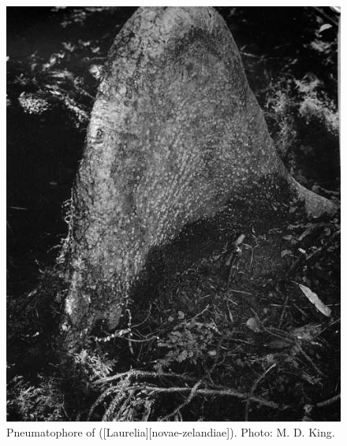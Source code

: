 \begin{figure}[t]
\begin{minipage}[t]{\textwidth}
\begin{minipage}[t]{(\textwidth-\fgap-\fgap) * \real{0.362}}
			\includegraphics[width=\textwidth]{graphics/fig_010}
			\caption[Pneumatophore of pukatea]{Pneumatophore of  ([Laurelia][novae-zelandiae]).
			Photo:  M. D. King.}%
			\label{fig:10pukatea}
		\end{minipage}\hspace{\fgap}%
		\begin{minipage}[t]{(\textwidth-\fgap-\fgap) * \real{0.295}}
			\centering

\end{minipage}
\end{minipage}
\end{figure}
